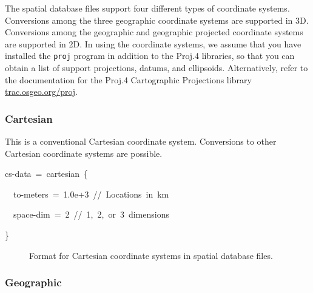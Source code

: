 The spatial database files support four different types of coordinate
systems. Conversions among the three geographic coordinate systems
are supported in 3D. Conversions among the geographic and geographic
projected coordinate systems are supported in 2D. In using the coordinate
systems, we assume that you have installed the \texttt{proj} program
in addition to the Proj.4 libraries, so that you can obtain a list
of support projections, datums, and ellipsoids. Alternatively, refer
to the documentation for the Proj.4 Cartographic Projections library
\url{trac.osgeo.org/proj}.


\subsubsection{Cartesian}

This is a conventional Cartesian coordinate system. Conversions to
other Cartesian coordinate systems are possible.
\begin{lyxcode}
cs-data~=~cartesian~\{

~~to-meters~=~1.0e+3~//~Locations~in~km

~~space-dim~=~2~//~1,~2,~or~3~dimensions

\}
\end{lyxcode}
\begin{figure}[H]
\caption{Format for Cartesian coordinate systems in spatial database files.}
\end{figure}



\subsubsection{Geographic}

